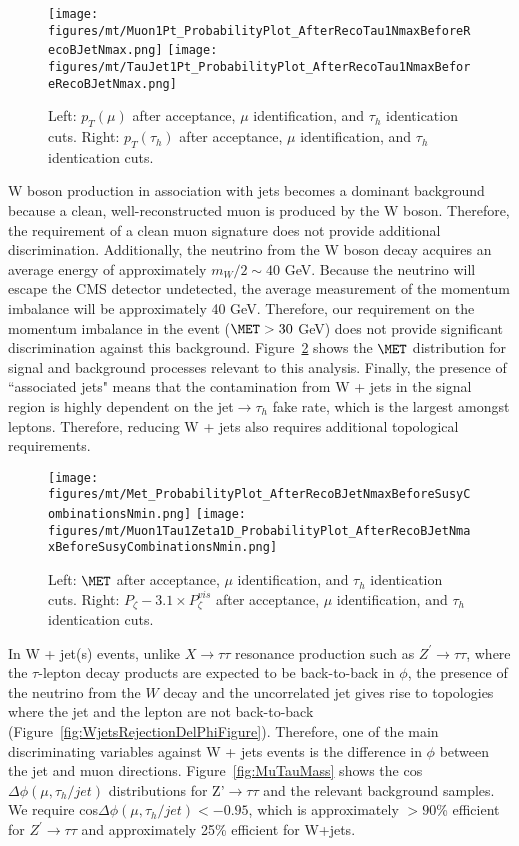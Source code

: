 \begin{figure}\centering
  \texttt{[image: figures/mt/Muon1Pt\_ProbabilityPlot\_AfterRecoTau1NmaxBeforeRecoBJetNmax.png]}
  \texttt{[image: figures/mt/TauJet1Pt\_ProbabilityPlot\_AfterRecoTau1NmaxBeforeRecoBJetNmax.png]}
  \caption{\label{fig:muTauKinematics} Left: $p_{T}(\mu)$ after acceptance, $\mu$ identification, and $\tau_{h}$ identication cuts.  Right: 
$p_{T}(\tau_{h})$ after acceptance, $\mu$ identification, and $\tau_{h}$ identication cuts.}
\end{figure}

W boson production in association with jets becomes a dominant background because a clean, well-reconstructed muon is produced by the W boson. 
Therefore, the requirement of a clean muon signature does not provide additional discrimination. Additionally, the neutrino from the W boson decay acquires 
an average energy of approximately $m_{W}/2 \sim 40$ GeV. Because the neutrino will escape the CMS detector undetected, the average measurement of the momentum 
imbalance will be approximately 40 GeV. Therefore, our requirement on the momentum imbalance in the event ($\MET > 30$ GeV) does not provide significant 
discrimination against this background. 
Figure~\ref{fig:muTauTopologicalVariables} shows
the $\MET$ distribution for signal and background processes relevant to this analysis. 
Finally, the presence of ``associated jets" means that the contamination from W + jets in the signal region is 
highly dependent on the jet$\to\tau_{h}$ fake rate, which is the largest amongst leptons. Therefore, reducing W + jets also requires additional 
topological requirements. 

\begin{figure}\centering
  \texttt{[image: figures/mt/Met\_ProbabilityPlot\_AfterRecoBJetNmaxBeforeSusyCombinationsNmin.png]}
  \texttt{[image: figures/mt/Muon1Tau1Zeta1D\_ProbabilityPlot\_AfterRecoBJetNmaxBeforeSusyCombinationsNmin.png]}
  \caption{\label{fig:muTauTopologicalVariables} Left: $\MET$ after acceptance, $\mu$ identification, and 
$\tau_{h}$ identication cuts.  Right: $P_{\zeta}- 3.1 \times P_{\zeta}^{vis}$ after acceptance, $\mu$ identification, and $\tau_{h}$ identication cuts.}
\end{figure}

In W + jet(s) events, unlike $X\rightarrow\tau\tau$ resonance production such as $Z^{\prime} \to \tau\tau$, where the $\tau$-lepton decay products are expected to 
be back-to-back in $\phi$, the presence of the neutrino from the $W$ decay and the uncorrelated jet gives rise to topologies where the jet and the lepton are not 
back-to-back (Figure~\ref{fig:WjetsRejectionDelPhiFigure}). Therefore, one of the main 
discriminating variables against W + jets events is the difference in $\phi$ between the jet and muon directions. 
Figure~\ref{fig:MuTauMass} shows the cos$\Delta \phi(\mu,\tau_{h}/jet)$ distributions for Z'$\to\tau\tau$ and the relevant background samples. 
We require cos$\Delta \phi(\mu,\tau_{h}/jet)<-0.95$, which is approximately $> 90$\% 
efficient for $Z^{\prime} \to \tau\tau$ and approximately 25\% efficient for W+jets.

